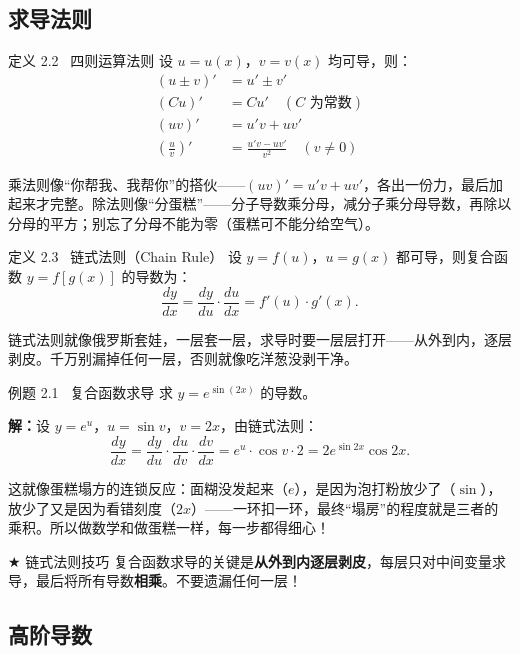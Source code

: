 \documentclass[12pt,a4paper]{article}
\newcommand{\purpletext}[1]{{\color{Royal}\textbf{#1}}}
\newcommand{\humor}[1]{\par\smallskip\begin{humorbox}#1\end{humorbox}\smallskip}
\begin{document}
\subsection{求导法则}

\begin{defbox}{定义 2.2 \ 四则运算法则}
设 $u = u(x)$，$v = v(x)$ 均可导，则：
\begin{align*}
(u \pm v)' &= u' \pm v' \\[4pt]
(Cu)' &= Cu' \quad (C\text{ 为常数}) \\[4pt]
(uv)' &= u'v + uv' \\[4pt]
\left(\frac{u}{v}\right)' &= \frac{u'v - uv'}{v^2} \quad (v \neq 0)
\end{align*}
\end{defbox}
\humor{乘法则像“你帮我、我帮你”的搭伙——$(uv)' = u'v + uv'$，各出一份力，最后加起来才完整。除法则像“分蛋糕”——分子导数乘分母，减分子乘分母导数，再除以分母的平方；别忘了分母不能为零（蛋糕可不能分给空气）。}

\begin{defbox}{定义 2.3 \ 链式法则（Chain Rule）}
设 $y = f(u)$，$u = g(x)$ 都可导，则复合函数 $y = f[g(x)]$ 的导数为：
\[
\frac{dy}{dx} = \frac{dy}{du} \cdot \frac{du}{dx} = f'(u) \cdot g'(x).
\]
\end{defbox}
\humor{链式法则就像俄罗斯套娃，一层套一层，求导时要一层层打开——从外到内，逐层剥皮。千万别漏掉任何一层，否则就像吃洋葱没剥干净。}

\begin{exbox}{例题 2.1 \ 复合函数求导}
求 $y = e^{\sin(2x)}$ 的导数。

\sffamily\textbf{解：}\normalfont 设 $y = e^u$，$u = \sin v$，$v = 2x$，由链式法则：
\[
\frac{dy}{dx} = \frac{dy}{du} \cdot \frac{du}{dv} \cdot \frac{dv}{dx} = e^u \cdot \cos v \cdot 2 = 2e^{\sin 2x}\cos 2x.
\]
\end{exbox}
\humor{这就像蛋糕塌方的连锁反应：面糊没发起来（$e$），是因为泡打粉放少了（$\sin$），放少了又是因为看错刻度（$2x$）——一环扣一环，最终“塌房”的程度就是三者的乘积。所以做数学和做蛋糕一样，每一步都得细心！}

\begin{tipbox}{$\bigstar$ 链式法则技巧}
复合函数求导的关键是\purpletext{从外到内逐层剥皮}，每层只对中间变量求导，最后将所有导数\purpletext{相乘}。不要遗漏任何一层！
\end{tipbox}

\subsection{高阶导数}
\end{document}

